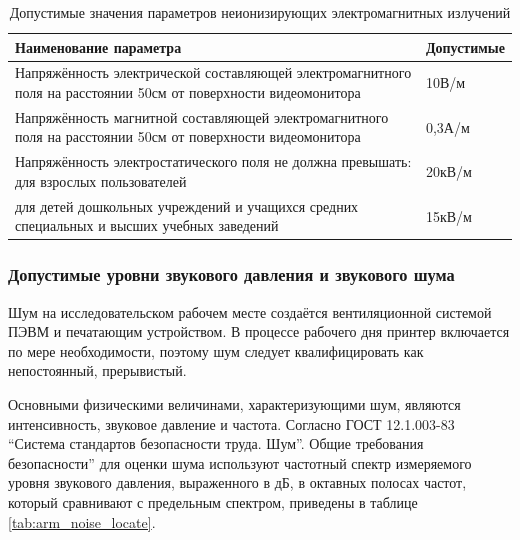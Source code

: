 \begin{table}[h]
\begin{longtable}[!ht]{|m{}|m{}|}
\caption{Допустимые значения параметров неионизирующих электромагнитных излучений}
\label{tab:min_neoinige_elwave}
\\ \hline
Наименование параметра & Допустимые \\ \hline
Напряжённость электрической составляющей электромагнитного поля на расстоянии 50см от поверхности видеомонитора & 10В/м\\ \hline
Напряжённость магнитной составляющей электромагнитного поля на расстоянии 50см от поверхности видеомонитора & 0,3А/м\\ \hline
Напряжённость электростатического поля не должна превышать: для взрослых пользователей & 20кВ/м\\ \hline
для детей дошкольных учреждений и учащихся средних специальных и высших учебных заведений & 15кВ/м\\ \hline
\end{longtable}
\end{table}

\subsubsection{Допустимые уровни звукового давления и звукового шума}

Шум на исследовательском рабочем месте создаётся вентиляционной системой ПЭВМ и печатающим устройством. В процессе рабочего дня принтер включается по мере необходимости, поэтому шум следует квалифицировать как непостоянный, прерывистый.

Основными физическими величинами, характеризующими шум, являются интенсивность, звуковое давление и частота. Согласно ГОСТ 12.1.003-83 ``Система стандартов безопасности труда. Шум''\cite{gost_sec_noize}. Общие требования безопасности'' для оценки шума используют частотный спектр измеряемого уровня звукового давления, выраженного в дБ, в октавных полосах частот, который сравнивают с предельным спектром, приведены в таблице \ref{tab:arm_noise_locate}.

